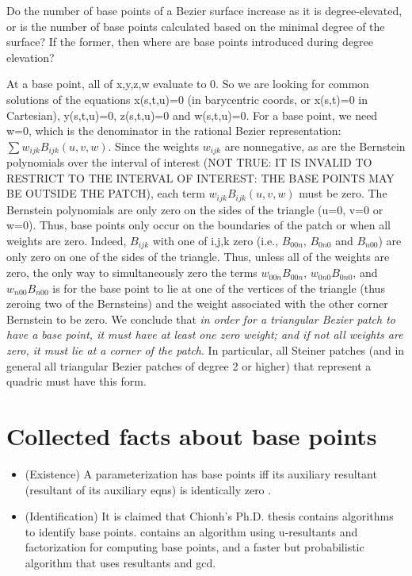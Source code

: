 Do the number of base points of a Bezier surface
increase as it is degree-elevated, or is
the number of base points calculated based
on the minimal degree of the surface?
If the former, then where are base points
introduced during degree elevation?

At a base point, all of x,y,z,w evaluate to 0.
So we are looking for common solutions of 
the equations x(s,t,u)=0 (in barycentric coords,
or x(s,t)=0 in Cartesian), y(s,t,u)=0,
z(s,t,u)=0 and w(s,t,u)=0.  
For a base point, we need w=0, which is the
denominator in the rational Bezier representation:
$\sum w_{ijk} B_{ijk}(u,v,w)$.
Since the weights $w_{ijk}$ are nonnegative, as are
the Bernstein polynomials over the interval of		
interest (NOT TRUE: IT IS INVALID TO RESTRICT TO THE INTERVAL OF 
INTEREST: THE BASE POINTS MAY BE OUTSIDE THE PATCH), 
each term $w_{ijk} B_{ijk}(u,v,w)$ must be zero.
The Bernstein polynomials are only zero on 
the sides of the triangle (u=0, v=0 or w=0).
Thus, base points only occur on the boundaries 
of the patch or when all weights are zero.
Indeed, $B_{ijk}$ with one of i,j,k zero (i.e., $B_{00n}$,
$B_{0n0}$ and $B_{n00}$) are only zero on one of the sides 
of the triangle.
Thus, unless all of the weights are zero,
the only way to simultaneously zero the
terms $w_{00n} B_{00n}$, $w_{0n0} B_{0n0}$, and $w_{n00} B_{n00}$
is for the base point to lie at one of the vertices
of the triangle (thus zeroing two of the Bernsteins)
and the weight associated with the other corner Bernstein
to be zero.
We conclude that {\em in order for a triangular Bezier patch
to have a base point, it must have at least one zero
weight; and if not all weights are zero, it must lie
at a corner of the patch}.
In particular, all Steiner patches (and in general
all triangular Bezier patches of degree 2 or higher)
that represent a quadric must have this form.

\section{Collected facts about base points}

\begin{itemize}
\item
(Existence) A parameterization has base points iff
its auxiliary resultant (resultant of its auxiliary
eqns) is identically zero \cite{Chionh92a,Chionh92c}.

\item
(Identification) It is claimed that Chionh's Ph.D. thesis contains
algorithms to identify base points.
\cite{Manocha92} contains an algorithm using u-resultants 
and factorization for computing base points,
and a faster but probabilistic algorithm that 
uses resultants and gcd.
\end{itemize}

